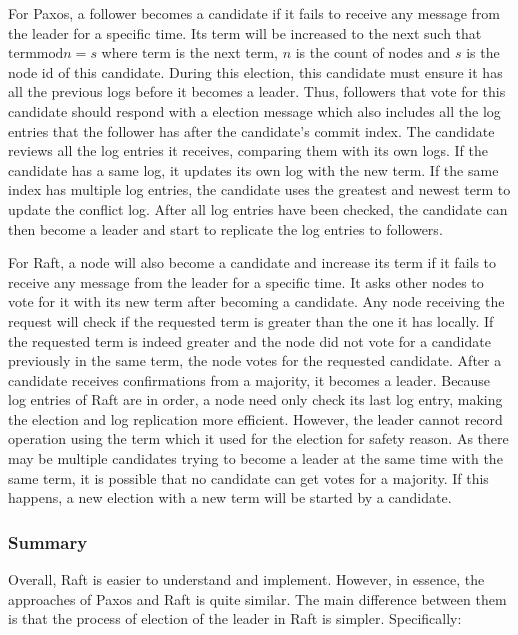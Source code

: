 \documentclass[12pt, a4paper]{article}
\begin{document}
For Paxos, a follower becomes a candidate if it fails to receive any message
from the leader for a specific time. Its term will be increased to the next
such that $\mathrm{term} \mathrm{mod} n = s$ where $\mathrm{term}$ is the next term,
$n$ is the count of nodes and $s$ is the node id of this candidate.
During this election, this candidate must ensure
it has all the previous logs before it becomes a leader.
Thus, followers that vote for this candidate should respond with
a election message which also includes all the log entries that
the follower has after the candidate’s commit index.
The candidate reviews all the log entries it receives,
comparing them with its own logs. If the candidate has a same log,
it updates its own log with the new term.
If the same index has multiple log entries, the candidate uses
the greatest and newest term to update the conflict log.
After all log entries have been checked, the candidate can then
become a leader and start to replicate the log entries to followers.

For Raft, a node will also become a candidate and increase its term if
it fails to receive any message from the leader for a specific time.
It asks other nodes to vote for it with its new term after becoming a candidate. Any node receiving the request will check if the requested term is greater than the one it has locally. If the requested term is indeed greater and the node did not vote for a candidate previously in the same term,
the node votes for the requested candidate.
After a candidate receives confirmations from a majority,
it becomes a leader. Because log entries of Raft are in order,
a node need only check its last log entry, making the election and log replication more efficient.
However, the leader cannot record operation using the term which
it used for the election for safety reason.
As there may be multiple candidates trying to become a leader at the same time with
the same term, it is possible that no candidate can get votes for a majority.
If this happens, a new election with a new term will be started by a candidate.

\subsubsection{Summary}
Overall, Raft is easier to understand and implement. However, in essence, the approaches of Paxos and Raft is quite similar. The main difference between them is that the process of election of the leader in Raft is simpler.
Specifically:
\end{document}
